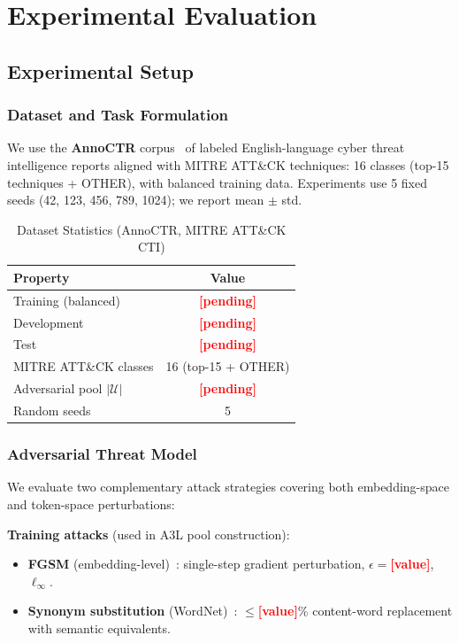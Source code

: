 \documentclass[review,1p,times,number]{elsarticle}
\newcommand{\TODO}[1]{\textcolor{red}{\textbf{[#1]}}}
\begin{document}
\section{Experimental Evaluation}
\label{sec:experiments}

\subsection{Experimental Setup}
\label{sec:setup}

\subsubsection{Dataset and Task Formulation}

We use the \textbf{AnnoCTR} corpus~\cite{annoctr2023} of labeled
English-language cyber threat intelligence reports aligned with MITRE
ATT\&CK techniques: 16 classes (top-15 techniques + OTHER), with
balanced training data. Experiments use 5 fixed seeds
(42, 123, 456, 789, 1024); we report mean $\pm$ std.

\begin{table}[htbp]
\caption{Dataset Statistics (AnnoCTR, MITRE ATT\&CK CTI)}
\label{tab:dataset}
\centering
\begin{tabular}{@{}lc@{}}
\toprule
\textbf{Property} & \textbf{Value} \\
\midrule
Training (balanced)        & \TODO{pending} \\
Development                & \TODO{pending} \\
Test                       & \TODO{pending} \\
MITRE ATT\&CK classes      & 16 (top-15 + OTHER) \\
Adversarial pool $|\mathcal{U}|$ & \TODO{pending} \\
Random seeds               & 5 \\
\bottomrule
\end{tabular}
\end{table}

\subsubsection{Adversarial Threat Model}

We evaluate two complementary attack strategies covering both
embedding-space and token-space perturbations:

\textbf{Training attacks} (used in A3L pool construction):
\begin{itemize}[leftmargin=1.5em,itemsep=1pt]
  \item \textbf{FGSM} (embedding-level)~\cite{goodfellow2015explaining}:
    single-step gradient perturbation, $\epsilon{=}$\TODO{value}, $\ell_\infty$.
  \item \textbf{Synonym substitution} (WordNet)~\cite{jin2020bert}:
    $\leq$\TODO{value}\% content-word replacement with semantic equivalents.
\end{itemize}
\end{document}
